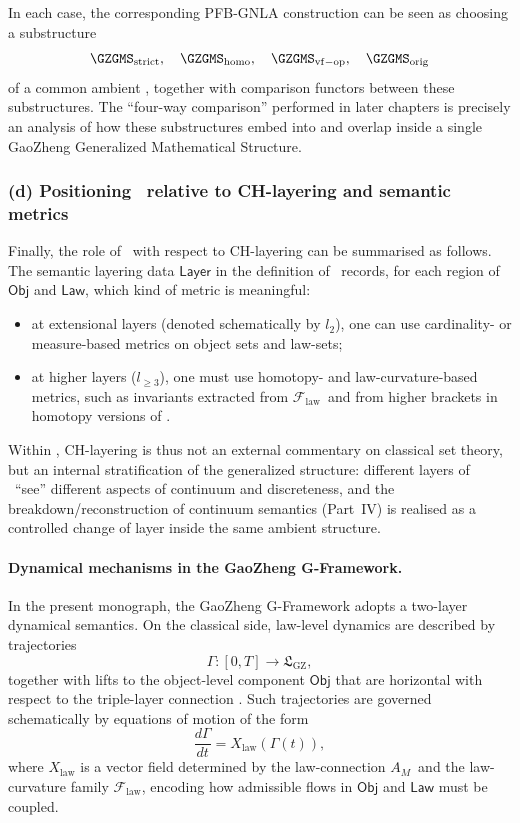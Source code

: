 \documentclass[11pt]{book}
\theoremstyle{plain}
\theoremstyle{definition}
\newcommand{\GZLS}{\ensuremath{\mathfrak{L}_{\mathrm{GZ}}}}       \newcommand{\GZLT}{\ensuremath{M_{!w}}}                           \newcommand{\GZLOC}{\ensuremath{A_M}}                             \newcommand{\GZLCurv}{\ensuremath{\mathcal{F}_{\mathrm{law}}}}
\begin{document}
In each case, the corresponding PFB-GNLA construction can be seen as
choosing a substructure
\[
   \GZGMS_{\mathrm{strict}},\quad
   \GZGMS_{\mathrm{homo}},\quad
   \GZGMS_{\mathrm{vf-op}},\quad
   \GZGMS_{\mathrm{orig}}
\]
of a common ambient \GZGMS, together with comparison functors between
these substructures. The “four-way comparison” performed in later
chapters is precisely an analysis of how these substructures embed
into and overlap inside a single GaoZheng Generalized Mathematical
Structure.


\subsubsection*{(d) Positioning \GZGMS\ relative to CH-layering and semantic metrics}

Finally, the role of \GZGMS\ with respect to CH-layering can be
summarised as follows. The semantic layering data $\mathsf{Layer}$ in
the definition of \GZGMS\ records, for each region of
$\mathsf{Obj}$ and $\mathsf{Law}$, which kind of metric is meaningful:

\begin{itemize}
  \item at extensional layers (denoted schematically by $l_2$), one
        can use cardinality- or measure-based metrics on object sets
        and law-sets;
  \item at higher layers ($l_{\ge3}$), one must use homotopy- and
        law-curvature-based metrics, such as invariants extracted from
        \GZLCurv\ and from higher brackets in homotopy versions of
        \GAlgebra.
\end{itemize}

Within \GZGMS, CH-layering is thus not an external commentary on
classical set theory, but an internal stratification of the generalized
structure: different layers of \GZGMS\ “see” different aspects of
continuum and discreteness, and the breakdown/reconstruction of
continuum semantics (Part~IV) is realised as a controlled change of
layer inside the same ambient structure.

\paragraph*{Dynamical mechanisms in the GaoZheng G-Framework.}
In the present monograph, the GaoZheng G-Framework adopts a two-layer
dynamical semantics. On the classical side, law-level dynamics are
described by trajectories
\[
  \Gamma:[0,T]\to\GZLS,
\]
together with lifts to the object-level component $\mathsf{Obj}$ that
are horizontal with respect to the triple-layer connection \GZTLC. Such
trajectories are governed schematically by equations of motion of the
form
\[
  \frac{d\Gamma}{dt} = X_{\mathrm{law}}(\Gamma(t)),
\]
where $X_{\mathrm{law}}$ is a vector field determined by the
law-connection \GZLOC\ and the law-curvature family \GZLCurv, encoding
how admissible flows in $\mathsf{Obj}$ and $\mathsf{Law}$ must be
coupled.
\end{document}
